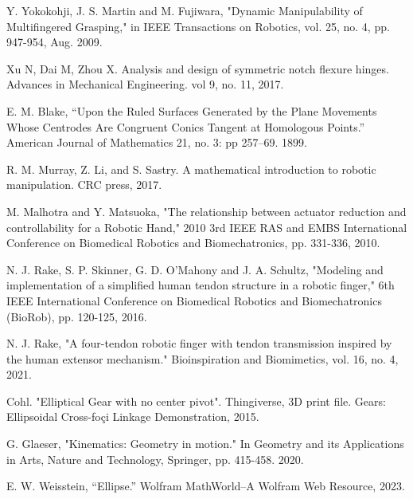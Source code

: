 \documentclass[journal]{IEEEtran}
\begin{document}
\begin{thebibliography}{1}
 Y. Yokokohji, J. S. Martin and M. Fujiwara, "Dynamic Manipulability of Multifingered Grasping," in IEEE Transactions on Robotics, vol. 25, no. 4, pp. 947-954, Aug. 2009.

 Xu N, Dai M, Zhou X. Analysis and design of symmetric notch flexure hinges. Advances in Mechanical Engineering. vol 9, no. 11, 2017.

 E. M. Blake, “Upon the Ruled Surfaces Generated by the Plane Movements Whose Centrodes Are Congruent Conics Tangent at Homologous Points.” American Journal of Mathematics 21, no. 3: pp 257–69. 1899. 

 R. M. Murray, Z. Li, and S. Sastry. A mathematical introduction to robotic manipulation. CRC press, 2017.

 M. Malhotra and Y. Matsuoka, "The relationship between actuator reduction and controllability for a Robotic Hand," 2010 3rd IEEE RAS and EMBS International Conference on Biomedical Robotics and Biomechatronics, pp. 331-336, 2010.

 N. J. Rake, S. P. Skinner, G. D. O'Mahony and J. A. Schultz, "Modeling and implementation of a simplified human tendon structure in a robotic finger," 6th IEEE International Conference on Biomedical Robotics and Biomechatronics (BioRob), pp. 120-125, 2016.

  N. J. Rake, "A four-tendon robotic finger with tendon transmission inspired by the human extensor mechanism." Bioinspiration and Biomimetics, vol. 16, no. 4, 2021.

 Cohl. "Elliptical Gear with no center pivot". Thingiverse, 3D print file. Gears: Ellipsoidal Cross-foçi Linkage Demonstration, 2015.

 G. Glaeser, "Kinematics: Geometry in motion." In Geometry and its Applications in Arts, Nature and Technology, Springer, pp. 415-458. 2020.

 E. W. Weisstein, “Ellipse.” Wolfram MathWorld--A Wolfram Web Resource, 2023.


\end{thebibliography}
\end{document}
